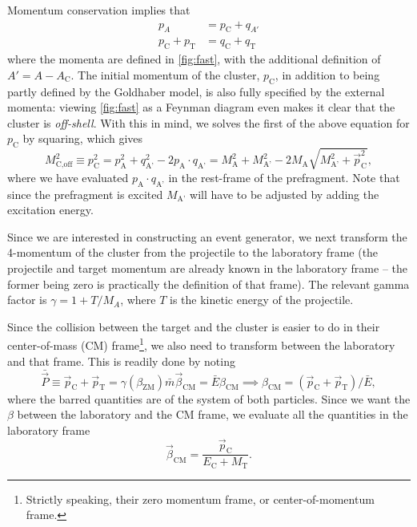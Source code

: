 Momentum conservation implies that
\begin{align}
p_{A} &= p_\text{C} + q_{A'} \\
p_\text{C} + p_\text{T} &= q_\text{C} + q_\text{T}
\end{align}
where the momenta are defined in \autoref{fig:fast}, with the additional definition of $A'=A-A_\text{C}$.
The initial momentum of the cluster, $p_\text{C}$, in addition to being partly defined by the Goldhaber model, is also fully specified by the external momenta: viewing \autoref{fig:fast} as a Feynman diagram even makes it clear that the cluster is \emph{off-shell}.
With this in mind, we solves the first of the above equation for $p_\text{C}$ by squaring, which gives
\begin{equation}
M_\text{C,off}^2 \equiv p_\text{C}^2 = p_\text{A}^2 +  q_\text{A'}^2 -  2p_\text{A}\cdot q_\text{A'} =M_\text{A}^2 + M_\text{A'}^2 - 2M_\text{A}\sqrt{M_\text{A'}^2 + \vec{p}_\text{C}^2},\label{eq:offmass}
\end{equation}
where we have evaluated $p_\text{A}\cdot q_\text{A'}$ in the rest-frame of the prefragment. Note that since the prefragment is excited $M_\text{A'}$ will have to be adjusted by adding the excitation energy.

Since we are interested in constructing an event generator, we next transform the 4-momentum of the cluster from the projectile to the laboratory frame (the projectile and target momentum are already known in the laboratory frame -- the former being zero is practically the definition of that frame). The relevant gamma factor is
$\gamma = 1 + T/M_A$, where $T$ is the kinetic energy of the projectile.

Since the collision between the target and the cluster is easier to do in their center-of-mass (CM) frame\footnote{Strictly speaking, their zero momentum frame, or center-of-momentum frame.}, we also need to transform between the laboratory and that frame. This is readily done by noting
\begin{equation}
\bar{\vec{P}} \equiv \vec{p}_\text{C} + \vec{p}_\text{T} = \gamma(\beta_\text{ZM}) \bar{m} \vec{\beta}_\text{CM} = \bar{E}\beta_\text{CM} \implies \beta_\text{CM} = (\vec{p}_\text{C} + \vec{p}_\text{T})/\bar{E},
\end{equation}
where the barred quantities are of the system of both particles. Since we want the $\beta$ between the laboratory and the CM frame, we evaluate all the quantities in the laboratory frame
\begin{equation}
\vec{\beta}_\text{CM} = \frac{\vec{p}_\text{C}}{E_\text{C} + M_\text{T}}. \label{eq:betazm}
\end{equation}

